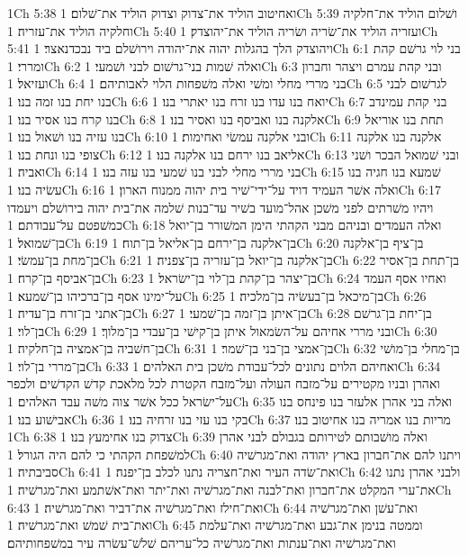 1Ch 5:38  ואחיטוב הוליד את־צדוק וצדוק הוליד את־שׁלום׃
1Ch 5:39  ושׁלום הוליד את־חלקיה וחלקיה הוליד את־עזריה׃
1Ch 5:40  ועזריה הוליד את־שׂריה ושׂריה הוליד את־יהוצדק׃
1Ch 5:41  ויהוצדק הלך בהגלות יהוה את־יהודה וירושׁלם ביד נבכדנאצר׃
1Ch 6:1  בני לוי גרשׁם קהת ומררי׃
1Ch 6:2  ואלה שׁמות בני־גרשׁום לבני ושׁמעי׃
1Ch 6:3  ובני קהת עמרם ויצהר וחברון ועזיאל׃
1Ch 6:4  בני מררי מחלי ומשׁי ואלה משׁפחות הלוי לאבותיהם׃
1Ch 6:5  לגרשׁום לבני בנו יחת בנו זמה בנו׃
1Ch 6:6  יואח בנו עדו בנו זרח בנו יאתרי בנו׃
1Ch 6:7  בני קהת עמינדב בנו קרח בנו אסיר בנו׃
1Ch 6:8  אלקנה בנו ואביסף בנו ואסיר בנו׃
1Ch 6:9  תחת בנו אוריאל בנו עזיה בנו ושׁאול בנו׃
1Ch 6:10  ובני אלקנה עמשׂי ואחימות׃
1Ch 6:11  אלקנה בנו אלקנה צופי בנו ונחת בנו׃
1Ch 6:12  אליאב בנו ירחם בנו אלקנה בנו׃
1Ch 6:13  ובני שׁמואל הבכר ושׁני ואביה׃
1Ch 6:14  בני מררי מחלי לבני בנו שׁמעי בנו עזה בנו׃
1Ch 6:15  שׁמעא בנו חגיה בנו עשׂיה בנו׃
1Ch 6:16  ואלה אשׁר העמיד דויד על־ידי־שׁיר בית יהוה ממנוח הארון׃
1Ch 6:17  ויהיו משׁרתים לפני משׁכן אהל־מועד בשׁיר עד־בנות שׁלמה את־בית יהוה בירושׁלם ויעמדו כמשׁפטם על־עבודתם׃
1Ch 6:18  ואלה העמדים ובניהם מבני הקהתי הימן המשׁורר בן־יואל בן־שׁמואל׃
1Ch 6:19  בן־אלקנה בן־ירחם בן־אליאל בן־תוח׃
1Ch 6:20  בן־ציף בן־אלקנה בן־מחת בן־עמשׂי׃
1Ch 6:21  בן־אלקנה בן־יואל בן־עזריה בן־צפניה׃
1Ch 6:22  בן־תחת בן־אסיר בן־אביסף בן־קרח׃
1Ch 6:23  בן־יצהר בן־קהת בן־לוי בן־ישׂראל׃
1Ch 6:24  ואחיו אסף העמד על־ימינו אסף בן־ברכיהו בן־שׁמעא׃
1Ch 6:25  בן־מיכאל בן־בעשׂיה בן־מלכיה׃
1Ch 6:26  בן־אתני בן־זרח בן־עדיה׃
1Ch 6:27  בן־איתן בן־זמה בן־שׁמעי׃
1Ch 6:28  בן־יחת בן־גרשׁם בן־לוי׃
1Ch 6:29  ובני מררי אחיהם על־השׂמאול איתן בן־קישׁי בן־עבדי בן־מלוך׃
1Ch 6:30  בן־חשׁביה בן־אמציה בן־חלקיה׃
1Ch 6:31  בן־אמצי בן־בני בן־שׁמר׃
1Ch 6:32  בן־מחלי בן־מושׁי בן־מררי בן־לוי׃
1Ch 6:33  ואחיהם הלוים נתונים לכל־עבודת משׁכן בית האלהים׃
1Ch 6:34  ואהרן ובניו מקטירים על־מזבח העולה ועל־מזבח הקטרת לכל מלאכת קדשׁ הקדשׁים ולכפר על־ישׂראל ככל אשׁר צוה משׁה עבד האלהים׃
1Ch 6:35  ואלה בני אהרן אלעזר בנו פינחס בנו אבישׁוע בנו׃
1Ch 6:36  בקי בנו עזי בנו זרחיה בנו׃
1Ch 6:37  מריות בנו אמריה בנו אחיטוב בנו׃
1Ch 6:38  צדוק בנו אחימעץ בנו׃
1Ch 6:39  ואלה מושׁבותם לטירותם בגבולם לבני אהרן למשׁפחת הקהתי כי להם היה הגורל׃
1Ch 6:40  ויתנו להם את־חברון בארץ יהודה ואת־מגרשׁיה סביבתיה׃
1Ch 6:41  ואת־שׂדה העיר ואת־חצריה נתנו לכלב בן־יפנה׃
1Ch 6:42  ולבני אהרן נתנו את־ערי המקלט את־חברון ואת־לבנה ואת־מגרשׁיה ואת־יתר ואת־אשׁתמע ואת־מגרשׁיה׃
1Ch 6:43  ואת־חילז ואת־מגרשׁיה את־דביר ואת־מגרשׁיה׃
1Ch 6:44  ואת־עשׁן ואת־מגרשׁיה ואת־בית שׁמשׁ ואת־מגרשׁיה׃
1Ch 6:45  וממטה בנימן את־גבע ואת־מגרשׁיה ואת־עלמת ואת־מגרשׁיה ואת־ענתות ואת־מגרשׁיה כל־עריהם שׁלשׁ־עשׂרה עיר במשׁפחותיהם׃
